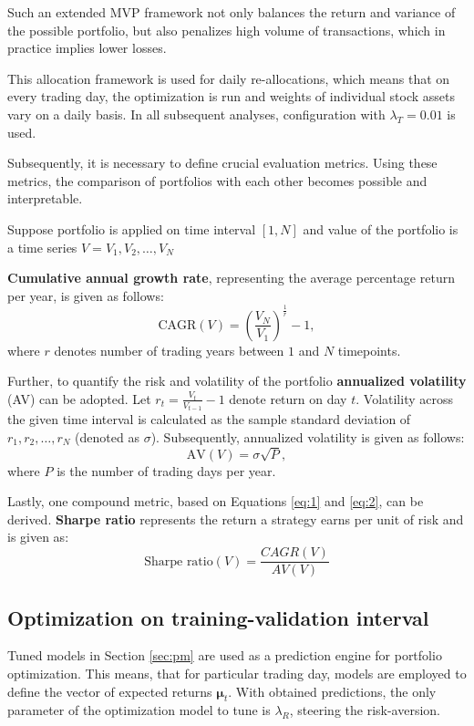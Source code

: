 \documentclass{svk_en}
\begin{document}
Such an extended MVP framework not only balances the return and variance of the possible portfolio, but also penalizes high volume of transactions, which
in practice implies lower losses.

This allocation framework is used for daily re-allocations, which means that on every trading day, the optimization is run and weights of individual stock assets
vary on a daily basis. In all subsequent analyses, configuration with $\lambda_T = 0.01$ is used.
\newline
\par
Subsequently, it is necessary to define crucial evaluation metrics. Using these metrics, the comparison of portfolios with each other becomes possible and interpretable.

Suppose portfolio is applied on time interval $[1, N]$ and value of the portfolio is a time series $V = V_1, V_2, \ldots, V_N$ 

\textbf{Cumulative annual growth rate}, representing the average percentage return per year, is given as follows:
\begin{equation}
    \label{eq:1}
    \text{CAGR}(V)=\left(\frac{V_N}{V_1}\right)^{\frac{1}{r}} - 1,
\end{equation}
where $r$ denotes number of trading years between $1$ and $N$ timepoints.

Further, to quantify the risk and volatility of the portfolio \textbf{annualized volatility} (AV) can be adopted. Let $r_t = \frac{V_t}{V_{t-1}} - 1$ denote return 
on day $t$. Volatility across the given time interval is calculated as the sample standard deviation of $r_1, r_2, \ldots, r_N$ (denoted as $\sigma$). Subsequently, annualized volatility is given as follows:
\begin{equation}
    \label{eq:2}
    \text{AV}(V) = \sigma\sqrt{P},
\end{equation}
where $P$ is the number of trading days per year.

Lastly, one compound metric, based on Equations \eqref{eq:1} and \eqref{eq:2}, can be derived. \textbf{Sharpe ratio} represents the return a strategy earns per unit of risk and is given as:
\begin{equation}
    \text{Sharpe ratio}(V) = \frac{CAGR(V)}{AV(V)}
\end{equation} 

\subsection{Optimization on training-validation interval}
Tuned models in Section \ref{sec:pm} are used as a prediction engine for portfolio optimization. This means, that
for particular trading day, models are employed to define the vector of expected returns $\bm{\mu}_t$.
With obtained predictions, the only parameter of the optimization model to tune is $\lambda_R$, steering the risk-aversion.
\end{document}
